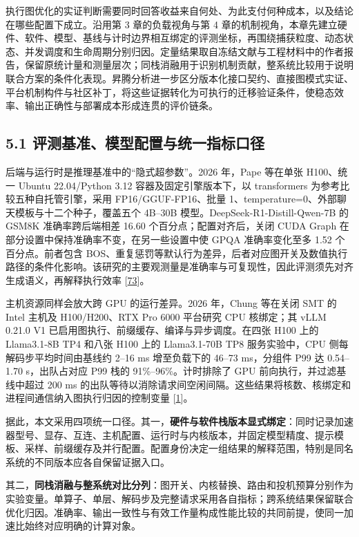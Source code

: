 \documentclass[UTF8,10.5pt,fontset=windows]{ctexart}
\begin{document}
执行图优化的实证判断需要同时回答收益来自何处、为此支付何种成本，以及结论在哪些配置下成立。沿用第
3 章的负载视角与第 4
章的机制视角，本章先建立硬件、软件、模型、基线与计时边界相互绑定的评测坐标，再围绕捕获粒度、动态状态、并发调度和生命周期分别归因。定量结果取自冻结文献与工程材料中的作者报告，保留原统计量和测量层次；同栈消融用于识别机制贡献，整系统比较用于说明联合方案的条件化表现。昇腾分析进一步区分版本化接口契约、直接图模式实证、平台机制构件与社区补丁，将这些证据转化为可执行的迁移验证条件，使稳态效率、输出正确性与部署成本形成连贯的评价链条。

\hypertarget{section-5-1}{%
\subsection{5.1 评测基准、模型配置与统一指标口径}\label{section-5-1}}

后端与运行时是推理基准中的``隐式超参数''。2026 年，Pape 等在单张
H100、统一 Ubuntu 22.04/Python 3.12 容器及固定引擎版本下，以
transformers 为参考比较五种自托管引擎，采用 FP16/GGUF-FP16、批量
1、temperature=0、外部聊天模板与十二个种子，覆盖五个 4B--30B
模型。DeepSeek-R1-Distill-Qwen-7B 的 GSM8K 准确率跨后端相差 16.60
个百分点；配置对齐后，关闭 CUDA Graph
在部分设置中保持准确率不变，在另一些设置中使 GPQA 准确率变化至多 1.52
个百分点。前者包含
BOS、重复惩罚等默认行为差异，后者对应图开关及数值执行路径的条件化影响。该研究的主要观测量是准确率与可复现性，因此评测须先对齐生成语义，再解释执行效率
{[}\protect\hyperlink{ref-pape2026backend}{73}{]}。

主机资源同样会放大跨 GPU 的运行差异。2026 年，Chung 等在关闭 SMT 的
Intel 主机及 H100/H200、RTX Pro 6000 平台研究 CPU 核绑定；其 vLLM 0.21.0
V1 已启用图执行、前缀缓存、编译与异步调度。在四张 H100 上的 Llama3.1-8B
TP4 和八张 H100 上的 Llama3.1-70B TP8 服务实验中，CPU
侧每解码步平均时间由基线约 2--16 ms 增至负载下的 46--73 ms，分组件 P99
达 0.54--1.70 s，出队占对应 P99 栈的 91\%--96\%。计时排除了 GPU
前向执行，并过滤基线中超过 200 ms
的出队等待以消除请求间空闲间隔。这些结果将核数、核绑定和进程间通信纳入图执行归因的控制变量
{[}\protect\hyperlink{ref-chung2026cpu}{1}{]}。

据此，本文采用四项统一口径。其一，\textbf{硬件与软件栈版本显式绑定}：同时记录加速器型号、显存、互连、主机配置、运行时与内核版本，并固定模型精度、提示模板、采样、前缀缓存及并行配置。配置身份决定一组结果的解释范围，特别是同名系统的不同版本应各自保留证据入口。

其二，\textbf{同栈消融与整系统对比分列}：图开关、内核替换、路由和投机预算分别作为实验变量。单算子、单层、解码步及完整请求采用各自指标；跨系统结果保留联合优化归因。准确率、输出一致性与有效工作量构成性能比较的共同前提，使同一加速比始终对应明确的计算对象。
\end{document}
